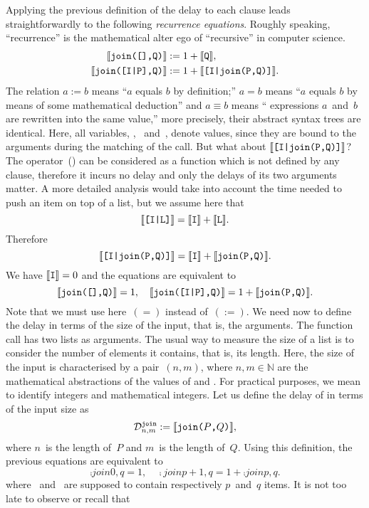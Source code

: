 \noindent Applying the previous definition of the delay to each clause
leads straightforwardly to the following \emph{recurrence
  equations}. Roughly speaking, ``recurrence'' is the mathematical
alter ego of ``recursive'' in computer science.
\begin{align*}
\delay{join([],Q)}    &:= 1 + \delay{Q},\\
\delay{join([I|P],Q)} &:= 1 + \delay{[I|join(P,Q)]}.
\end{align*}
The relation \(a := b\) means ``\(a\) equals \(b\) by
definition;'' \(a = b\) means ``\(a\) equals \(b\) by means of some
mathematical deduction'' and \(a \mathrel{\equiv} b\) means ``\Erlang
expressions \(a\)~and~\(b\) are rewritten into the same value,'' more
precisely, their abstract syntax trees are identical. Here, all
\Erlang variables, , ~and~, denote
values, since they are bound to the arguments during the matching of
the call. But what about \(\delay{[I|join(P,Q)]}\)? The \Erlang
operator~(\erlcode{|}) can be considered as a function which is not
defined by any clause, therefore it incurs no delay and only the
delays of its two arguments matter. A more detailed analysis would
take into account the time needed to push an item on top of a list,
but we assume here that
\[
\delay{[I|L]} = \delay{I} + \delay{L}.
\]
Therefore
\[
\delay{[I|join(P,Q)]} = \delay{I} + \delay{join(P,Q)}.
\]
We have \(\delay{I} = 0\) and the equations are equivalent to
\[
\delay{join([],Q)}    = 1,\quad
\delay{join([I|P],Q)} = 1 + \delay{join(P,Q)}.
\]
Note that we must use here~\((=)\) instead of~\((:=)\). We
need now to define the delay in terms of the size of the input, that
is, the arguments. The function call  has
two lists as arguments. The usual way to measure the size of a list is
to consider the number of elements it contains, that is, its
length. Here, the size of the input is characterised by a
pair~\((n,m)\), where \(n, m \in \mathbb{N}\) are the mathematical
abstractions of the values of  and
. For practical purposes, we mean to identify
\Erlang integers and mathematical integers. Let us define the delay of
 in terms of the input size as
\[
\comp{join}{n,m} := \delay{join(\(P\),\(Q\))},
\]
where \(n\)~is the length of~\(P\) and \(m\)~is the length of~\(Q\).
Using this definition, the previous equations are equivalent to
\[
\comp{join}{0,q}   = 1,\quad
\comp{join}{p+1,q} = 1 + \comp{join}{p,q}.
\]
where ~and~ are supposed to contain respectively
\(p\)~and~\(q\) items. It is not too late to observe or recall that
